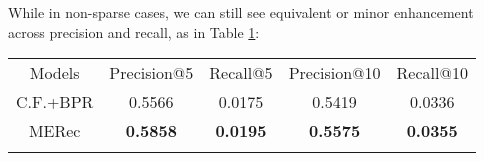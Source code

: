 While in non-sparse cases, we can still see equivalent or minor enhancement across precision and recall, as in Table \ref{tbl3}:
    
\begin{table}
    {\begin{tabular}{@{}ccccc@{}}\toprule
    Models & Precision@5 & Recall@5 & Precision@10 & Recall@10 \\
    \colrule
    C.F.+BPR\hphantom{00} & 0.5566 & 0.0175 & 0.5419 & 0.0336 \\
    MERec\hphantom{00} & \hphantom{0} \textbf{0.5858} & \textbf{0.0195} & \textbf{0.5575} & \textbf{0.0355} \\
    
    \botrule
    \end{tabular}
    }
    \label{tbl3}
\end{table}
    








